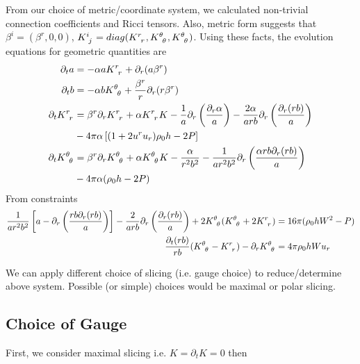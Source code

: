 \documentclass[prd]{revtex4}
\begin{document}
From our choice of metric/coordinate system, we calculated non-trivial connection coefficients and Ricci tensors. Also, metric form suggests that $\beta^i = (\beta^r,0,0)$, $K\indices{^i_j} = diag(K\indices{^r_r}, K\indices{^\theta_\theta},K\indices{^\theta_\theta})$. Using these facts, the evolution equations for geometric quantities are
\begin{align}
\partial_t a &= - \alpha a K\indices{^r_r} + \partial_r (a \beta^r) \\
\partial_t b &= - \alpha b K\indices{^\theta_\theta} + \frac{\beta^r}{r} \partial_r (r \beta^r) \\
\partial_t K\indices{^r_r} &= \beta^r \partial_r K\indices{^r_r} + \alpha K\indices{^r_r} K - \frac{1}{a} \partial_r \left( \frac{\partial_r \alpha}{a} \right) - \frac{2 \alpha}{arb} \partial_r \left( \frac{\partial_r (rb)}{a} \right) \nonumber \\
& - 4 \pi \alpha \left[ (1+2 u^r u_r) \rho_0 h - 2P \right] \\
\partial_t K\indices{^\theta_\theta} &= \beta^r \partial_r K\indices{^\theta_\theta} + \alpha K\indices{^\theta_\theta} K - \frac{\alpha}{r^2 b^2} - \frac{1}{ar^2b^2} \partial_r \left( \frac{\alpha r b \partial_r (rb)}{a} \right) \nonumber \\
& - 4 \pi \alpha (\rho_0 h -2 P)
\end{align}
From constraints
\begin{align}
 \frac{1}{ar^2b^2} \left[a-\partial_r \left(\frac{rb \partial_r (rb)}{a} \right) \right] -\frac{2}{arb} \partial_r \left(\frac{\partial_r (rb)}{a} \right) + 2K\indices{^\theta_\theta}(K\indices{^\theta_\theta}+2 K\indices{^r_r}) &= 16 \pi (\rho_0 h W^2 -P) \nonumber \\
 \frac{\partial_t (r b)}{rb} (K\indices{^\theta_\theta} - K\indices{^r_r}) - \partial_r K\indices{^\theta_\theta} &= 4 \pi \rho_0 h W u_r
\end{align}

We can apply different choice of slicing (i.e. gauge choice) to reduce/determine above system. Possible (or simple) choices would be maximal or polar slicing. 

\subsection{Choice of Gauge}

First, we consider maximal slicing i.e. $K=\partial_t K = 0$ then 
\end{document}

